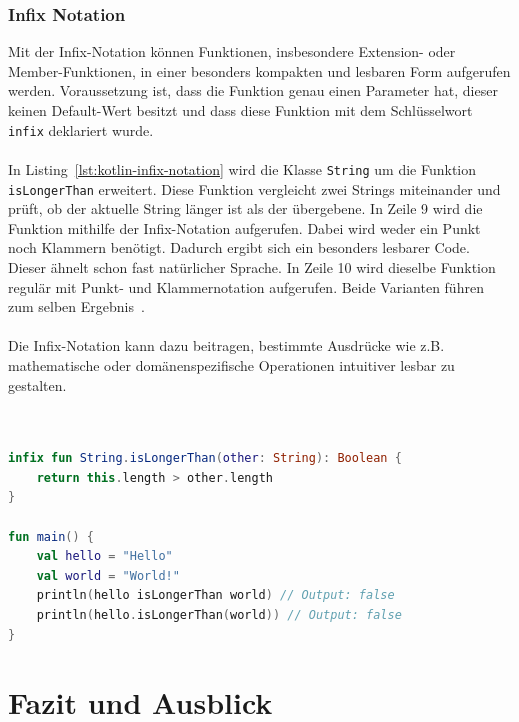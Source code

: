 \documentclass[11pt]{article}
\begin{document}
    \subsubsection{Infix Notation}
    Mit der Infix-Notation können Funktionen, insbesondere Extension- oder Member-Funktionen, in einer besonders kompakten und lesbaren Form aufgerufen werden.
    Voraussetzung ist, dass die Funktion genau einen Parameter hat, dieser keinen Default-Wert besitzt und dass diese Funktion mit dem Schlüsselwort \texttt{infix} deklariert wurde.\\
    \\
    In Listing~\ref{lst:kotlin-infix-notation} wird die Klasse \texttt{String} um die Funktion \texttt{isLongerThan} erweitert.
    Diese Funktion vergleicht zwei Strings miteinander und prüft, ob der aktuelle String länger ist als der übergebene.
    In Zeile 9 wird die Funktion mithilfe der Infix-Notation aufgerufen.
    Dabei wird weder ein Punkt noch Klammern benötigt.
    Dadurch ergibt sich ein besonders lesbarer Code.
    Dieser ähnelt schon fast natürlicher Sprache.
    In Zeile 10 wird dieselbe Funktion regulär mit Punkt- und Klammernotation aufgerufen.
    Beide Varianten führen zum selben Ergebnis~\cite{kotlin-infix-notation}.\\
    \\
    Die Infix-Notation kann dazu beitragen, bestimmte Ausdrücke wie z.B. mathematische oder domänenspezifische Operationen intuitiver lesbar zu gestalten.\\
    \\

    \begin{lstlisting}[language=Kotlin, caption={InfixNotation.kt}, label={lst:kotlin-infix-notation}]

infix fun String.isLongerThan(other: String): Boolean {
    return this.length > other.length
}

fun main() {
    val hello = "Hello"
    val world = "World!"
    println(hello isLongerThan world) // Output: false
    println(hello.isLongerThan(world)) // Output: false
}
    \end{lstlisting}

    \section{Fazit und Ausblick}
\end{document}
